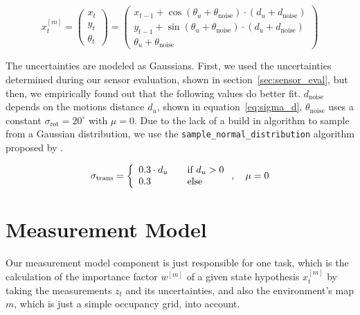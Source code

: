 \begin{equation}\label{eq:sample_motion}
	x^{[m]}_t = \left(
    \begin{array}{c}
      x_t\\
      y_t\\
      \theta_t
    \end{array}
  \right) = \left(\begin{array}{c} x_{t-1} + \cos(\theta_u + \theta_{\text{noise}})\cdot (d_u + d_\text{noise}) \\ y_{t-1} + \sin(\theta_u + \theta_{\text{noise}})\cdot (d_u + d_\text{noise}) \\ \theta_u + \theta_{\text{noise}}
    \end{array}
  \right)
\end{equation}

The uncertainties are modeled as Gaussians. First, we used the uncertainties determined during our sensor evaluation, shown in section~\ref{sec:sensor_eval}, but then, we empirically found out that the following values do better fit. $d_\text{noise}$ depends on the motions distance $d_u$, shown in equation~\ref{eq:sigma_d}, $\theta_\text{noise}$ uses a constant $\sigma_\text{rot} = 20^{\circ}$ with $\mu = 0$. Due to the lack of a build in algorithm to sample from a Gaussian distribution, we use the \texttt{sample\_normal\_distribution} algorithm proposed by \citet[p.~124]{thrun:prob_robo}.

\begin{equation}\label{eq:sigma_d}
	\sigma_{\text{trans}} = \left\{ 
  \begin{array}{l l}
    0.3 \cdot d_u & \quad \text{if $d_u > 0$}\\
    0.3 & \quad \text{else}
  \end{array} \right. ,\quad \mu = 0
\end{equation}


\section{Measurement Model}\label{sec:algo_measurement_model}
Our measurement model component is just responsible for one task, which is the calculation of the importance factor $w^{[m]}$ of a given state hypothesis $x^{[m]}_t$ by taking the measurements $z_t$ and its uncertainties, and also the environment's map $m$, which is just a simple occupancy grid, into account.

